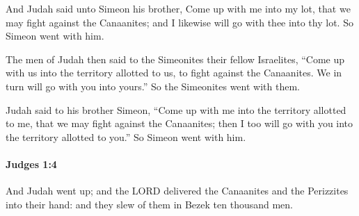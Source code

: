 			\begin{versebox}
					\item[BHS] 
					\item[ASV] And Judah said unto Simeon his brother, Come up with me into my lot, that we may fight against the Canaanites; and I likewise will go with thee into thy lot. So Simeon went with him.
					\item[NIV] The men of Judah then said to the Simeonites their fellow Israelites, “Come up with us into the territory allotted to us, to fight against the Canaanites. We in turn will go with you into yours.” So the Simeonites went with them.
					\item[NRSV] Judah said to his brother Simeon, “Come up with me into the territory allotted to me, that we may fight against the Canaanites; then I too will go with you into the territory allotted to you.” So Simeon went with him.
			\end{versebox}

		\paragraph{Judges 1:4} %
			\label{JUDGES-1-4}

			And Judah went up; and the LORD delivered the Canaanites and the Perizzites into their hand: and they slew of them in Bezek ten thousand men.

